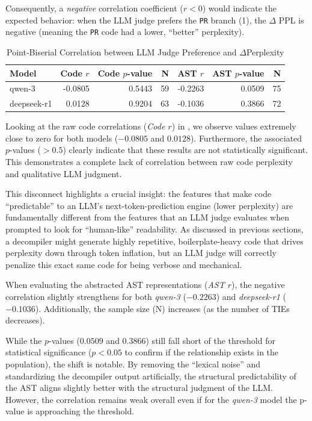 Consequently, a \textit{negative} correlation coefficient ($r < 0$) would indicate the expected behavior: when the LLM judge prefers the \texttt{PR} branch (1), the $\Delta$ PPL is negative (meaning the \texttt{PR} code had a lower, ``better'' perplexity). 

\begin{table}%
\centering
\caption{Point-Biserial Correlation between LLM Judge Preference and $\Delta$Perplexity}\label{tab:ppl_correlation}
\begin{tabular}{lrrrrrr}
\toprule
\textbf{Model} & \textbf{Code $r$} & \textbf{Code $p$-value} & \textbf{N} & \textbf{AST $r$} & \textbf{AST $p$-value} & \textbf{N} \\
\midrule
qwen-3 & -0.0805 & 0.5443 & 59 & -0.2263 & 0.0509 & 75 \\
deepseek-r1 & 0.0128 & 0.9204 & 63 & -0.1036 & 0.3866 & 72 \\
\bottomrule
\end{tabular}
\end{table}

Looking at the raw code correlations (\emph{Code $r$}) in , we observe values extremely close to zero for both models ($-0.0805$ and $0.0128$). Furthermore, the associated $p$-values ($> 0.5$) clearly indicate that these results are not statistically significant. This demonstrates a complete lack of correlation between raw code perplexity and qualitative \ac{LLM} judgment. 

This disconnect highlights a crucial insight: the features that make code ``predictable'' to an LLM's next-token-prediction engine (lower perplexity) are fundamentally different from the features that an LLM judge evaluates when prompted to look for ``human-like'' readability. As discussed in previous sections, a decompiler might generate highly repetitive, boilerplate-heavy code that drives perplexity down through token inflation, but an LLM judge will correctly penalize this exact same code for being verbose and mechanical.

When evaluating the abstracted \ac{AST} representations (\emph{AST $r$}), the negative correlation slightly strengthens for both \emph{qwen-3} ($-0.2263$) and \emph{deepseek-r1} ($-0.1036$). Additionally, the sample size (N) increases (as the number of TIEs decreases).

While the $p$-values ($0.0509$ and $0.3866$) still fall short of the threshold for statistical significance ($p < 0.05$ to confirm if the relationship exists in the population), the shift is notable. By removing the ``lexical noise'' and standardizing the decompiler output artificially, the structural predictability of the \ac{AST} aligns slightly better with the structural judgment of the \ac{LLM}. However, the correlation remains weak overall even if for the \emph{qwen-3} model the p-value is approaching the threshold.

